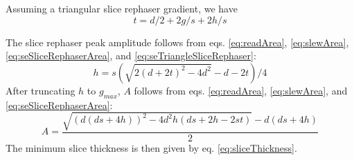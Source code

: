 \documentclass{article}
\begin{document}
Assuming a triangular slice rephaser gradient, we have
\begin{equation}
    t = d/2 + 2g/s + 2h/s
    \label{eq:seTriangleSliceRephaser}
\end{equation}

The slice rephaser peak amplitude follows from eqs. \ref{eq:readArea}, \ref{eq:slewArea}, \ref{eq:seSliceRephaserArea}, and \ref{eq:seTriangleSliceRephaser}:
\begin{equation}
    h = s(\sqrt{2(d + 2t)^2-4d^2}- d - 2t)/4
    \label{eq:GREprephaserAmp}
\end{equation}
After truncating $h$ to $g_{max}$, $A$ follows from eqs. \ref{eq:readArea}, \ref{eq:slewArea}, and \ref{eq:seSliceRephaserArea}:
\begin{equation}
    A = \frac{\sqrt{(d(ds + 4h))^2-4d^2h(ds+2h-2st)}-d(ds + 4h)}{2}
    \label{eq:GREprephaserAmp}
\end{equation}
The minimum slice thickness is then given by eq. \ref{eq:sliceThickness}.
\end{document}
